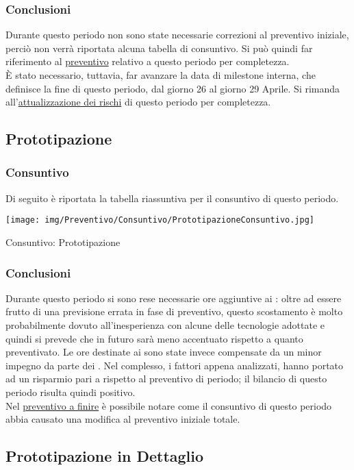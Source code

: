 \subsubsection{Conclusioni}
Durante questo periodo non sono state necessarie correzioni al preventivo iniziale, perciò non verrà riportata alcuna tabella di consuntivo. Si può quindi far riferimento al \hyperref[PreventivoAnalisiRequisitiDettaglio]{preventivo} relativo a questo periodo per completezza. \\
È stato necessario, tuttavia, far avanzare la data di milestone interna, che definisce la fine di questo periodo, dal giorno 26 al giorno 29 Aprile. Si rimanda all'\hyperref[RiscontroAnalisiDettaglio]{attualizzazione dei rischi} di questo periodo per completezza.

\newpage
\subsection{Prototipazione}
\subsubsection{Consuntivo}
Di seguito è riportata la tabella riassuntiva per il consuntivo di questo periodo.
\begin{table}[h!]
	\centerline{\texttt{[image: img/Preventivo/Consuntivo/PrototipazioneConsuntivo.jpg]}}
	\caption{Consuntivo: Prototipazione}
\end{table}
\subsubsection{Conclusioni}
Durante questo periodo si sono rese necessarie ore aggiuntive ai \progrs{}: oltre ad essere frutto di una previsione errata in fase di preventivo, questo scostamento è molto probabilmente dovuto all'inesperienza con alcune delle tecnologie adottate e quindi si prevede che in futuro sarà meno accentuato rispetto a quanto preventivato. Le ore destinate ai \progrs{} sono state invece compensate da un minor impegno da parte dei \progs{}. Nel complesso, i fattori appena analizzati, hanno portato ad un risparmio pari a  rispetto al preventivo di periodo; il bilancio di questo periodo risulta quindi positivo. \\ 
Nel \hyperref[PreventivoFinire]{preventivo a finire} è possibile notare come il consuntivo di questo periodo abbia causato una modifica al preventivo iniziale totale.

\subsection{Prototipazione in Dettaglio}
